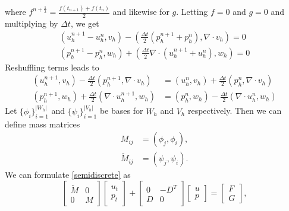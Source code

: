 \documentclass[11pt]{article}
\begin{document}
where $f^{n+\frac{1}{2}} = \frac{f(t_{n+1})+f(t_n)}{2}$ and likewise for $g$. Letting $f = 0$ and $g=0$ and multiplying by $\Delta t$, we get
\begin{equation}
\begin{split}
\left(u^{n+1}_h-u^n_h,v_h\right)-\left(\frac{\Delta t}{2}\left(p^{n+1}_h+p^n_h\right),\nabla \cdot v_h\right) = 0 \\
\left(p^{n+1}_h-p^n_h,w_h\right)+\left(\frac{\Delta t}{2}\nabla \cdot\left(u^{n+1}_h+u^n_h\right),w_h\right) = 0
\end{split}
\end{equation}
Reshuffling terms leads to 
\begin{equation}\label{discretizationfinal}
\begin{split}
\left(u^{n+1}_h,v_h\right) - \frac{\Delta t}{2}\left(p^{n+1}_h, \nabla \cdot v_h\right) &= \left(u^n_h, v_h\right) +\frac{\Delta t}{2}\left(p^n_h,\nabla \cdot v_h\right) \\
\left(p^{n+1}_h,w_h\right) + \frac{\Delta t}{2}\left(\nabla \cdot u^{n+1}_h,w_h\right) &= \left(p^n_h,w_h\right) - \frac{\Delta t}{2}\left(\nabla \cdot u^n_h,w_h\right)
\end{split}
\end{equation}
 Let $\{\phi_i\}_{i=1}^{|W_h|}$ and $\{\psi_i\}_{i=1}^{|V_h|}$ be bases for $W_h$ and $V_h$ respectively. Then we can define mass matrices  %
\begin{equation}
\begin{split}
M_{ij} &= (\phi_j,\phi_i), \\
\tilde{M}_{ij} &= (\psi_j,\psi_i).
\end{split}
\end{equation}
We can formulate \eqref{semidiscrete} as
\begin{equation}
\begin{bmatrix}
\tilde{M} & 0\\
0 & M
\end{bmatrix} \begin{bmatrix}
u_t \\
p_t
\end{bmatrix} + \begin{bmatrix}
0 & -D^T \\
D & 0
\end{bmatrix} \begin{bmatrix}
u \\
p
\end{bmatrix} = \begin{bmatrix}
F \\
G
\end{bmatrix},
\end{equation} %
\end{document}
